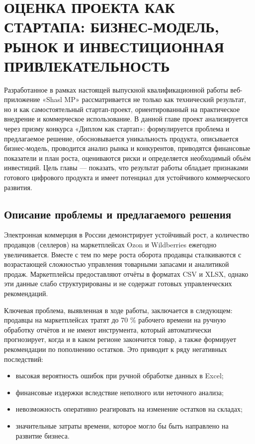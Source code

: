 \chapter{ОЦЕНКА ПРОЕКТА КАК СТАРТАПА: БИЗНЕС-МОДЕЛЬ, РЫНОК И ИНВЕСТИЦИОННАЯ ПРИВЛЕКАТЕЛЬНОСТЬ}

Разработанное в рамках настоящей выпускной квалификационной работы веб-приложение «Shasl MP» рассматривается не только как технический результат, но и как самостоятельный стартап-проект, ориентированный на практическое внедрение и коммерческое использование. В данной главе проект анализируется через призму конкурса «Диплом как стартап»: формулируется проблема и предлагаемое решение, обосновывается уникальность продукта, описывается бизнес-модель, проводится анализ рынка и конкурентов, приводятся финансовые показатели и план роста, оцениваются риски и определяется необходимый объём инвестиций. Цель главы --- показать, что результат работы обладает признаками готового цифрового продукта и имеет потенциал для устойчивого коммерческого развития.

\section{Описание проблемы и предлагаемого решения}

Электронная коммерция в России демонстрирует устойчивый рост, а количество продавцов (селлеров) на маркетплейсах Ozon и Wildberries ежегодно увеличивается. Вместе с тем по мере роста оборота продавцы сталкиваются с возрастающей сложностью управления товарными запасами и аналитикой продаж. Маркетплейсы предоставляют отчёты в форматах CSV и XLSX, однако эти данные слабо структурированы и не содержат готовых управленческих рекомендаций.

Ключевая проблема, выявленная в ходе работы, заключается в следующем: продавцы на маркетплейсах тратят до 70 \% рабочего времени на ручную обработку отчётов и не имеют инструмента, который автоматически прогнозирует, когда и в каком регионе закончится товар, а также формирует рекомендации по пополнению остатков. Это приводит к ряду негативных последствий:

\begin{itemize}
\item высокая вероятность ошибок при ручной обработке данных в Excel;
\item финансовые издержки вследствие неполного или неточного анализа;
\item невозможность оперативно реагировать на изменение остатков на складах;
\item значительные затраты времени, которое могло бы быть направлено на развитие бизнеса.
\end{itemize}

